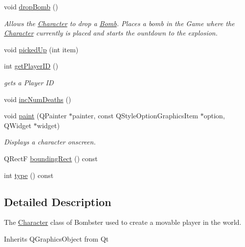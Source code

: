 \begin{DoxyCompactItemize}
void \hyperlink{class_character_a38747fb2a1e186e6cc871f0836eb83e8}{drop\-Bomb} ()
\begin{DoxyCompactList}\small\item\em Allows the \hyperlink{class_character}{Character} to drop a \hyperlink{class_bomb}{Bomb}. Places a bomb in the Game where the \hyperlink{class_character}{Character} currently is placed and starts the ountdown to the explosion. \end{DoxyCompactList}\item 
void \hyperlink{class_character_acb99685904de8dce448ad8a51efed7cb}{picked\-Up} (int item)
\item 
int \hyperlink{class_character_aacb2a15ce71f1165daceb29cf481a4cb}{get\-Player\-I\-D} ()
\begin{DoxyCompactList}\small\item\em gets a Player I\-D \end{DoxyCompactList}\item 
void \hyperlink{class_character_a6789fcbdc901b0871a20f21b43ea5d32}{inc\-Num\-Deaths} ()
\item 
void \hyperlink{class_character_a099916c7331625461d7cd976ec4b0498}{paint} (Q\-Painter $\ast$painter, const Q\-Style\-Option\-Graphics\-Item $\ast$option, Q\-Widget $\ast$widget)
\begin{DoxyCompactList}\small\item\em Displays a character onscreen. \end{DoxyCompactList}\item 
Q\-Rect\-F \hyperlink{class_character_af3bf8c7fe7ddbad47b54193374d25ee2}{bounding\-Rect} () const 
\item 
int \hyperlink{class_character_aba58d60bcfe61c1807e1a9e9439b56f0}{type} () const 
\end{DoxyCompactItemize}


\subsection{Detailed Description}
The \hyperlink{class_character}{Character} class of Bombster used to create a movable player in the world. 

Inherits Q\-Graphics\-Object from Qt 

